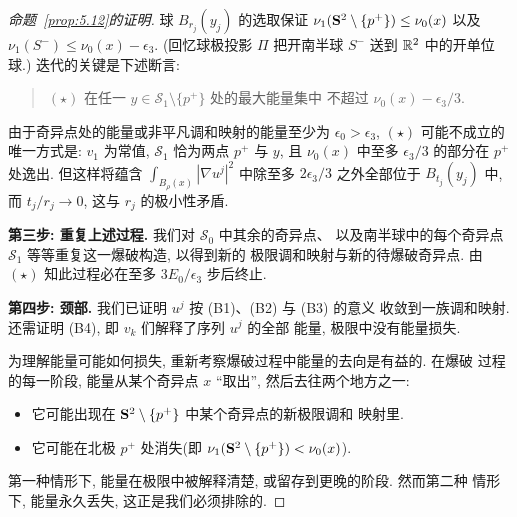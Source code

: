 \begin{proof}[命题~\ref{prop:5.12}的证明]
球 $B_{r_j}(y_j)$ 的选取保证
$\nu_1(\mathbf{S}^2\setminus\{p^+\})\leq\nu_0(x)$ 以及
$\nu_1(S^-)\leq\nu_0(x)-\epsilon_3$. (回忆球极投影 $\Pi$ 把开南半球
$S^-$ 送到 $\mathbb{R}^2$ 中的开单位球.) 迭代的关键是下述断言:

\begin{quote}
$(\star)$ 在任一 $y\in\mathcal{S}_1\setminus\{p^+\}$ 处的最大能量集中
不超过 $\nu_0(x)-\epsilon_3/3$.
\end{quote}

由于奇异点处的能量或非平凡调和映射的能量至少为
$\epsilon_0>\epsilon_3$, $(\star)$ 可能不成立的唯一方式是: $v_1$ 为常值,
$\mathcal{S}_1$ 恰为两点 $p^+$ 与 $y$, 且 $\nu_0(x)$ 中至多
$\epsilon_3/3$ 的部分在 $p^+$ 处逸出. 但这样将蕴含
$\int_{B_\rho(x)}|\nabla u^j|^2$ 中除至多 $2\epsilon_3/3$ 之外全部位于
$B_{t_j}(y_j)$ 中, 而 $t_j/r_j\to 0$, 这与 $r_j$ 的极小性矛盾.

\textbf{第三步: 重复上述过程.} 我们对 $\mathcal{S}_0$ 中其余的奇异点、
以及南半球中的每个奇异点 $\mathcal{S}_1$ 等等重复这一爆破构造, 以得到新的
极限调和映射与新的待爆破奇异点. 由 $(\star)$ 知此过程必在至多
$3E_0/\epsilon_3$ 步后终止.

\textbf{第四步: 颈部.} 我们已证明 $u^j$ 按 (B1)、(B2) 与 (B3) 的意义
收敛到一族调和映射. 还需证明 (B4), 即 $v_k$ 们解释了序列 $u^j$ 的全部
能量, 极限中没有能量损失.

为理解能量可能如何损失, 重新考察爆破过程中能量的去向是有益的. 在爆破
过程的每一阶段, 能量从某个奇异点 $x$ ``取出'', 然后去往两个地方之一:

\begin{itemize}[leftmargin=1.8em,itemsep=1pt,topsep=2pt]
\item 它可能出现在 $\mathbf{S}^2\setminus\{p^+\}$ 中某个奇异点的新极限调和
      映射里.
\item 它可能在北极 $p^+$ 处消失(即
      $\nu_1(\mathbf{S}^2\setminus\{p^+\})<\nu_0(x)$).
\end{itemize}

第一种情形下, 能量在极限中被解释清楚, 或留存到更晚的阶段. 然而第二种
情形下, 能量永久丢失, 这正是我们必须排除的.


\end{proof}
